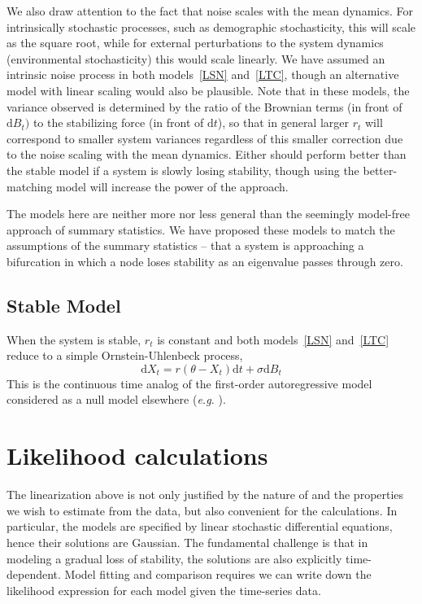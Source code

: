 \documentclass[authoryear, preprint,review,12pt]{elsarticle}
\newcommand{\ud}{\mathrm{d}}
\begin{document}
We also draw attention to the fact that noise scales with the mean dynamics.  
For intrinsically stochastic processes, such as demographic stochasticity, this will scale as the square root, 
while for external perturbations to the system dynamics (environmental stochasticity) this would scale linearly.
We have assumed an intrinsic noise process in both models~\eqref{LSN} and~\eqref{LTC}, 
though an alternative model with linear scaling would also be plausible.  
Note that in these models, the variance observed is determined by the ratio of the Brownian terms (in front of $\ud B_t)$
to the stabilizing force (in front of $\ud t$), so that in general larger $r_t$ will correspond to smaller system variances
regardless of this smaller correction due to the noise scaling with the mean dynamics.  
Either should perform better than the stable model if a system is slowly losing stability,
though using the better-matching model will increase the power of the approach.  

The models here are neither more nor less general than the seemingly model-free approach of summary statistics.  
We have proposed these models to match the assumptions of the summary statistics -- 
that a system is approaching a bifurcation in which a node loses stability as an eigenvalue passes through zero.  


\subsection{Stable Model}
When the system is stable, $r_t$ is constant and both models~\eqref{LSN} and~\eqref{LTC} reduce to a simple Ornstein-Uhlenbeck process, 
\begin{equation}
\ud X_t = r (\theta - X_t) \ud t + \sigma \ud B_t \label{OU}
\end{equation}
This is the continuous time analog of the first-order autoregressive model considered as a null model elsewhere (\emph{e.g.} \citet{Dakos2008, Guttal2008a}).  

\section{Likelihood calculations}\label{likelihood}
The linearization above is not only justified by the nature of and the properties we wish to estimate from the data,
but also convenient for the calculations. 
In particular, the models are specified by linear stochastic differential equations, hence their solutions are Gaussian.
The fundamental challenge is that in modeling a gradual loss of stability, the solutions are also explicitly time-dependent.
Model fitting and comparison requires we can write down the likelihood expression for each model given the time-series data.  
\end{document}
